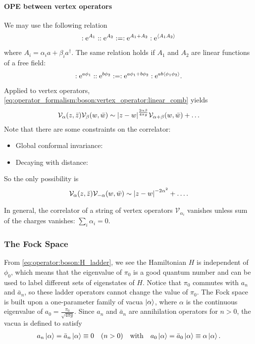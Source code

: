 \documentclass[10pt]{article}
\newcommand{\me}{\mathrm{e}}
\begin{document}
\paragraph{OPE between vertex operators}
We may use the following relation 
\begin{align}
    :\me^{A_1}::\me^{A_2}:=:\me^{A_1+A_2}:\me^{\expval{A_1 A_2}}
\end{align}
where $A_i=\alpha_i a+\beta_i a^\dagger$.
The same relation holds if $A_1$ and $A_2$ are linear functions of a free field:
\begin{align}\label{eq:operator_formalism:boson:vertex_operator:linear_comb}
    :\me^{a\phi_1}::\me^{b\phi_2}:=:\me^{a\phi_1+b\phi_2}:\me^{ab\expval{\phi_1 \phi_2}}.
\end{align}
Applied to vertex operators, \cref{eq:operator_formalism:boson:vertex_operator:linear_comb} yields
\begin{align}
    \mathcal{V}_\alpha(z,\bar{z})\mathcal{V}_\beta(w,\bar{w})\sim\abs{z-w}^{\frac{2\alpha\beta}{4\pi g}}\mathcal{V}_{\alpha+\beta}(w,\bar{w})+\dots
\end{align}
Note that there are some constraints on the correlator: 
\begin{itemize}
    \item Global conformal invariance:
    \item Decaying with distance:
\end{itemize}
So the only possibility is 
\begin{align}
    \mathcal{V}_\alpha(z,\bar{z})\mathcal{V}_{-\alpha}(w,\bar{w})\sim\abs{z-w}^{-2\alpha^2}+\dots.
\end{align}
\begin{remark}
    In general, the correlator of a string of vertex operators $\mathcal{V}_{\alpha_i}$ vanishes unless sum of the charges vanishes: $\sum_i\alpha_i=0$.
\end{remark}
\subsubsection{The Fock Space}
From \cref{eq:operator:boson:H_ladder}, we see the Hamiltonian $H$ is independent of $\phi_0$, which means that the eigenvalue of $\pi_0$ is a good quantum number and can be used to label different sets of eigenstates of $H$.
Notice that $\pi_0$ commutes with $a_n$ and $\bar{a}_n$, so these ladder operators cannot change the value of $\pi_0$.
The Fock space is built upon a one-parameter family of vacua $\ket{\alpha}$, where $\alpha$ is the continuous eigenvalue of $a_0=\frac{\pi_0}{\sqrt{4\pi g}}$.
Since $a_n$ and $\bar{a}_n$ are annihilation operators for $n>0$, the vacua is defined to satisfy
\begin{align}
    a_n\ket{\alpha}=\bar{a}_n\ket{\alpha}\equiv0\quad(n>0)\quad\text{with}\quad a_0\ket{\alpha}=\bar{a}_0\ket{\alpha}\equiv\alpha\ket{\alpha}.
\end{align}
\end{document}
